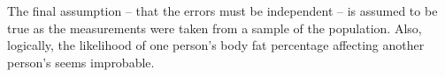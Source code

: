 \documentclass[a4paper, 11pt]{article}
\begin{document}
The final assumption -- that the errors must be independent -- is assumed to be true as the measurements were taken from a sample of the population. Also, logically, the likelihood of one person's body fat percentage affecting another person's seems improbable.


%
\end{document}
